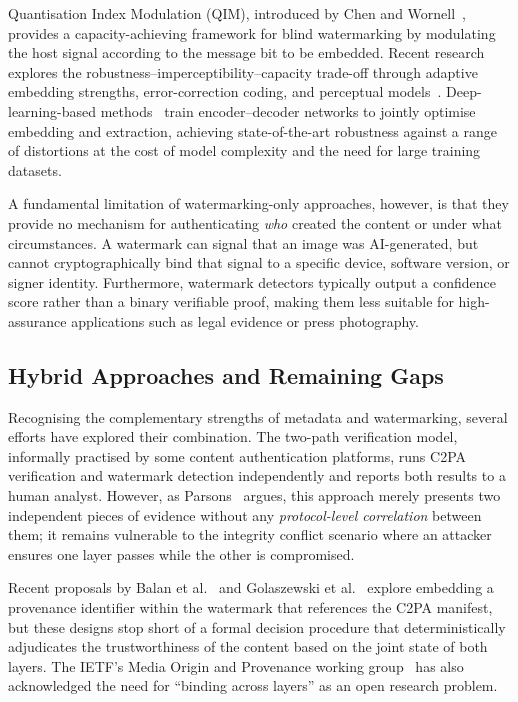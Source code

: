 \documentclass[conference]{IEEEtran}
\begin{document}
Quantisation Index Modulation (QIM), introduced by Chen and
Wornell~\cite{chen2001qim}, provides a capacity-achieving framework for
blind watermarking by modulating the host signal according to the message
bit to be embedded.
Recent research explores the robustness–imperceptibility–capacity
trade-off through adaptive embedding strengths, error-correction coding,
and perceptual models~\cite{fang2020deep, luo2020distortion_agnostic}.
Deep-learning-based methods~\cite{zhu2018hidden, tancik2020stegastamp}
train encoder–decoder networks to jointly optimise embedding and
extraction, achieving state-of-the-art robustness against a range of
distortions at the cost of model complexity and the need for large
training datasets.

A fundamental limitation of watermarking-only approaches, however, is
that they provide no mechanism for authenticating \textit{who} created the
content or under what circumstances.
A watermark can signal that an image was AI-generated, but cannot
cryptographically bind that signal to a specific device, software version,
or signer identity.
Furthermore, watermark detectors typically output a confidence score
rather than a binary verifiable proof, making them less suitable for
high-assurance applications such as legal evidence or press photography.

\subsection{Hybrid Approaches and Remaining Gaps}

Recognising the complementary strengths of metadata and watermarking,
several efforts have explored their combination.
The two-path verification model, informally practised by some content
authentication platforms, runs C2PA verification and watermark detection
independently and reports both results to a human analyst.
However, as Parsons~\cite{parsons2023integrity} argues, this approach
merely presents two independent pieces of evidence without any
\textit{protocol-level correlation} between them; it remains vulnerable to
the integrity conflict scenario where an attacker ensures one layer passes
while the other is compromised.

Recent proposals by Balan et al.~\cite{balan2023ekila} and
Golaszewski et al.~\cite{golaszewski2026verifying} explore embedding a provenance
identifier within the watermark that references the C2PA manifest, but
these designs stop short of a formal decision procedure that
deterministically adjudicates the trustworthiness of the content based on
the joint state of both layers.
The IETF's Media Origin and Provenance working group~\cite{ietf_mops}
has also acknowledged the need for ``binding across layers'' as an open
research problem.
\end{document}

